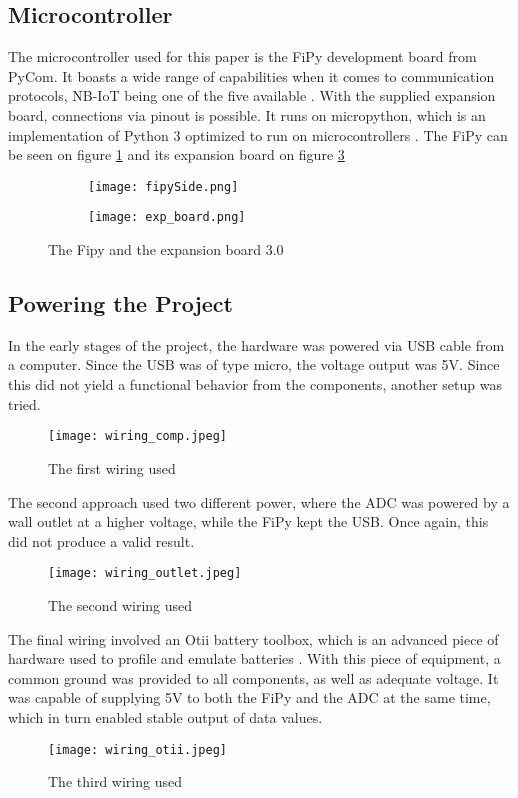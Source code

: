 \subsection{Microcontroller}
The microcontroller used for this paper is the FiPy development board from PyCom. It boasts a wide range of capabilities when it comes to communication protocols, NB-IoT being one of the five available \cite{fipy-docs}. With the supplied expansion board, connections via pinout is possible. It runs on micropython, which is an implementation of Python 3 optimized to run on microcontrollers \cite{micropython}. The FiPy can be seen on figure \ref{fig:fipySide} and its expansion board on figure \ref{fig:exp_board}
\begin{figure}[H]
\begin{subfigure}{0.5\textwidth}
	\centering
	\texttt{[image: fipySide.png]}
	\caption{}
	\label{fig:fipySide}
\end{subfigure}
%
\begin{subfigure}{0.5\textwidth}
	\centering
	\texttt{[image: exp\_board.png]}
	\caption{}
	\label{fig:exp_board}
\end{subfigure}
\caption{The Fipy and the expansion board 3.0}
\end{figure}

\subsection{Powering the Project}
In the early stages of the project, the hardware was powered via USB cable from a computer. Since the USB was of type micro, the voltage output was 5V. Since this did not yield a functional behavior from the components, another setup was tried.
\begin{figure}[h]
	\centering
	\texttt{[image: wiring\_comp.jpeg]}
	\caption{The first wiring used\cite{lucid-chart}}
	\label{fig:wiring_comp}
\end{figure}

The second approach used two different power, where the ADC was powered by a wall outlet at a higher voltage, while the FiPy kept the USB. Once again, this did not produce a valid result.
\begin{figure}[H]
	\centering
	\texttt{[image: wiring\_outlet.jpeg]}
	\caption{The second wiring used\cite{lucid-chart}}
	\label{fig:wiring_outlet}
\end{figure}

The final wiring involved an Otii battery toolbox, which is an advanced piece of hardware used to profile and emulate batteries \cite{otii-web}. With this piece of equipment, a common ground was provided to all components, as well as adequate voltage. It was capable of supplying 5V to both the FiPy and the ADC at the same time, which in turn enabled stable output of data values. 
\begin{figure}[H]
	\centering
	\texttt{[image: wiring\_otii.jpeg]}
	\caption{The third wiring used\cite{lucid-chart}}
	\label{fig:wiring_otii}
\end{figure}

